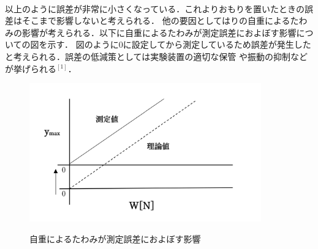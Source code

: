 \documentclass[a4paper,12pt]{jsarticle}
\begin{document}
\begin{enumerate}
\begin{table}[h]
\begin{tabular}{|p{3cm}|p{3cm}|p{4cm}|}
  \end{tabular}
\end{table}\\
以上のように誤差が非常に小さくなっている．これよりおもりを置いたときの誤差はそこまで影響しないと考えられる．
他の要因としてはりの自重によるたわみの影響が考えられる．以下に自重によるたわみが測定誤差におよぼす影響についての図を示す．
図のように0に設定してから測定しているため誤差が発生したと考えられる．誤差の低減策としては実験装置の適切な保管
や振動の抑制などが挙げられる$^{[1]}$．
\clearpage
\begin{figure}[h]
  \centering
  {\includegraphics[width=10cm]{9.jpg}}
  \caption{自重によるたわみが測定誤差におよぼす影響}
\end{figure}




\end{enumerate}
\end{document}
